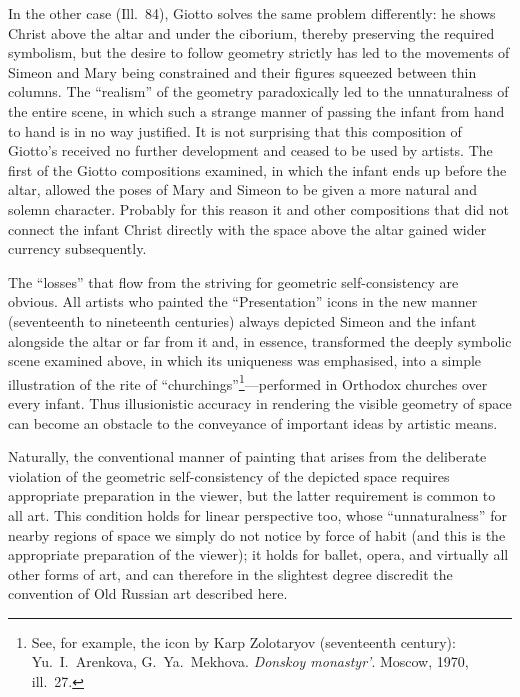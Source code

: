 

In the other case (Ill.~84), Giotto solves the same problem differently: he shows Christ
above the altar and under the ciborium, thereby preserving the required symbolism, but
the desire to follow geometry strictly has led to the movements of Simeon and Mary being
constrained and their figures squeezed between thin columns.  The ``realism'' of the
geometry paradoxically led to the unnaturalness of the entire scene, in which such a
strange manner of passing the infant from hand to hand is in no way justified.  It is
not surprising that this composition of Giotto's received no further development and
ceased to be used by artists.  The first of the Giotto compositions examined, in which
the infant ends up before the altar, allowed the poses of Mary and Simeon to be given a
more natural and solemn character.  Probably for this reason it and other compositions
that did not connect the infant Christ directly with the space above the altar gained
wider currency subsequently.

The ``losses'' that flow from the striving for geometric self-consistency are obvious.
All artists who painted the ``Presentation'' icons in the new manner (seventeenth to
nineteenth centuries) always depicted Simeon and the infant alongside the altar or far
from it and, in essence, transformed the deeply symbolic scene examined above, in which
its uniqueness was emphasised, into a simple illustration of the rite of
``churchings''\footnote{See, for example, the icon by Karp Zolotaryov (seventeenth
  century): Yu.~I.~Arenkova, G.~Ya.~Mekhova.  \emph{Donskoy monastyr'}.  Moscow, 1970,
  ill.~27.}---performed in Orthodox churches over every infant.  Thus illusionistic
accuracy in rendering the visible geometry of space can become an obstacle to the
conveyance of important ideas by artistic means.

Naturally, the conventional manner of painting that arises from the deliberate violation
of the geometric self-consistency of the depicted space requires appropriate preparation
in the viewer, but the latter requirement is common to all art.  This condition holds
for linear perspective too, whose ``unnaturalness'' for nearby regions of space we simply
do not notice by force of habit (and this is the appropriate preparation of the viewer);
it holds for ballet, opera, and virtually all other forms of art, and can therefore in
the slightest degree discredit the convention of Old Russian art described here.

